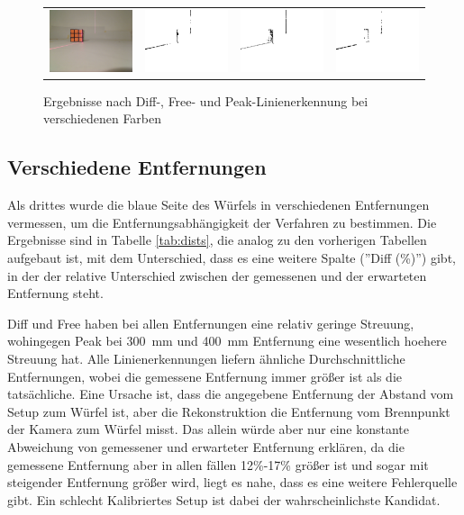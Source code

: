 \documentclass[ngerman,a4paper,parskip=half]{scrartcl}
\begin{document}
\begin{figure}[H]
\begin{tabular}{c|c|c|c}
		\includegraphics[width=.22\textwidth]{includes/orange_0.png} & 
		\includegraphics[width=.22\textwidth]{includes/orange_0_diff.png} &
		\includegraphics[width=.22\textwidth]{includes/orange_0_free.png} &
		\includegraphics[width=.22\textwidth]{includes/orange_0_peak.png}
		
	\end{tabular}
	\caption{Ergebnisse nach Diff-, Free- und Peak-Linienerkennung bei verschiedenen Farben}
	\label{fig:cols}
\end{figure}

\subsection{Verschiedene Entfernungen}
\label{sec:dists}

Als drittes wurde die blaue Seite des Würfels in verschiedenen Entfernungen vermessen, um die Entfernungsabhängigkeit der Verfahren zu bestimmen. Die Ergebnisse sind in Tabelle \ref{tab:dists}, die analog zu den vorherigen Tabellen aufgebaut ist, mit dem Unterschied, dass es eine weitere Spalte (''Diff (\%)'') gibt, in der der relative Unterschied zwischen der gemessenen und der erwarteten Entfernung steht.

Diff und Free haben bei allen Entfernungen eine relativ geringe Streuung, wohingegen Peak bei 300~mm und 400~mm Entfernung eine wesentlich hoehere Streuung hat. Alle Linienerkennungen liefern ähnliche Durchschnittliche Entfernungen, wobei die gemessene Entfernung immer größer ist als die tatsächliche. Eine Ursache ist, dass die angegebene Entfernung der Abstand vom Setup zum Würfel ist, aber die Rekonstruktion die Entfernung vom Brennpunkt der Kamera zum Würfel misst. Das allein würde aber nur eine konstante Abweichung von gemessener und erwarteter Entfernung erklären, da die gemessene Entfernung aber in allen fällen 12\%-17\% größer ist und sogar mit steigender Entfernung größer wird, liegt es nahe, dass es eine weitere Fehlerquelle gibt. Ein schlecht Kalibriertes Setup ist dabei der wahrscheinlichste Kandidat.
\end{document}

